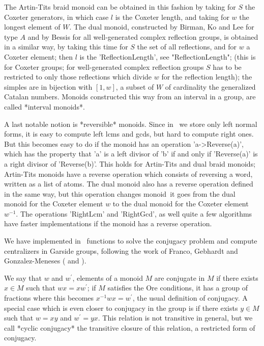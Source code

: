 The  Artin-Tits braid monoid can be obtained  in this fashion by taking for
$S$  the Coxeter generators, in  which case $l$ is  the Coxeter length, and
taking  for $w$ the longest element of $W$. The dual monoid, constructed by
Birman,  Ko  and  Lee  for  type  $A$  and by Bessis for all well-generated
complex  reflection groups,  is obtained  in a  similar way, by taking this
time  for $S$ the  set of all  reflections, and for  $w$ a Coxeter element;
then  $l$ is the  'ReflectionLength', see "ReflectionLength";  (this is for
Coxeter  groups; for well-generated complex reflection groups $S$ has to be
restricted  to only those  reflections which divide  $w$ for the reflection
length);  the simples  are in  bijection with  $[1,w]$, a  subset of $W$ of
cardinality the generalized Catalan numbers. Monoids constructed this way
from an interval in a group, are called *interval monoids*.

A  last notable notion is *reversible*  monoids. Since in \CHEVIE\ we store
only  left normal forms, it is easy to compute left lcms and gcds, but hard
to  compute right ones.  But this becomes  easy to do  if the monoid has an
operation  'a->Reverse(a)',  which  has  the  property  that  'a' is a left
divisor  of  'b'  if  and  only  if  'Reverse(a)'  is  a  right  divisor of
'Reverse(b)'.  This holds for Artin-Tits and dual braid monoids; Artin-Tits
monoids  have  a  reverse  operation  which  consists  of reversing a word,
written  as a list of  atoms. The dual monoid  also has a reverse operation
defined  in the same way, but this operation changes monoid\:\ it goes from
the  dual monoid  for the  Coxeter element  $w$ to  the dual monoid for the
Coxeter element $w^{-1}$. The operations 'RightLcm' and 'RightGcd', as well
quite  a few  algorithms have  faster implementations  if the  monoid has a
reverse operation.

We  have implemented in  \CHEVIE\ functions to  solve the conjugacy problem
and  compute centralizers in Garside groups,  following the work of Franco,
Gebhardt and Gonzalez-Meneses (\cite{gebgon10} and \cite{fragon03}).

We  say that $w$ and $w^\prime$, elements  of a monoid $M$ are conjugate in
$M$ if there exists $x\in M$ such that $wx=xw^\prime$; if $M$ satisfies the
{ O}re conditions, it has a group of fractions where this becomes
$x^{-1}wx=w^\prime$,  the  usual  definition  of  conjugacy. A special case
which  is even closer to conjugacy in the group is if there exists $y\in M$
such  that $w=xy$  and $w^\prime=yx$.  This relation  is not  transitive in
general,  but we  call *cyclic  conjugacy* the  transitive closure  of this
relation, a restricted form of conjugacy.

